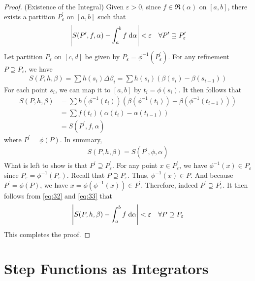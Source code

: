 \documentclass[thmcnt=section, 12pt]{my-elegantbook}
\begin{document}
\begin{proof}
    \par (Existence of the Integral) Given $\varepsilon > 0$, since $f \in \mathfrak{R}(\alpha)$ on $[a, b]$, there exists a partition $P^\prime_\varepsilon$ on $[a, b]$ such that 
    \begin{align}
        \left\lvert S(P^\prime, f, \alpha) - \int_a^b f \; \mathrm{d}\alpha \right\rvert < \varepsilon
        \quad \forall P^\prime \supseteq P^\prime_\varepsilon
        \label{eq:32}
    \end{align}
    Let partition $P_\varepsilon$ on $[c, d]$ be given by $P_\varepsilon = \phi^{-1}(P^\prime_\varepsilon)$. For any refinement $P \supseteq P_\varepsilon$, we have 
    \begin{align*}
        S(P, h, \beta)
        = \sum h(s_i) \Delta\beta_i
        = \sum h(s_i) (\beta(s_i) - \beta(s_{i-1}))
    \end{align*}
    For each point $s_i$, we can map it to $[a, b]$ by $t_i = \phi(s_i)$. It then follows that 
    \begin{align*}
        S(P, h, \beta)
        &= \sum h(\phi^{-1}(t_i)) (\beta(\phi^{-1}(t_i)) - \beta(\phi^{-1}(t_{i-1}))) \\ 
        &= \sum f(t_i) (\alpha(t_i) - \alpha(t_{i-1})) \\ 
        &= S(P^\prime, f, \alpha)
    \end{align*}
    where $P^\prime = \phi(P)$. In summary,
    \begin{align}
        S(P, h, \beta) = S(P^\prime, \phi, \alpha)
        \label{eq:33}
    \end{align}
    What is left to show is that $P^\prime \supseteq P^\prime_\varepsilon$. For any point $x \in P^\prime_\varepsilon$, we have $\phi^{-1}(x) \in P_\varepsilon$ since $P_\varepsilon = \phi^{-1}(P_\varepsilon)$. Recall that $P \supseteq P_\varepsilon$. Thus, $\phi^{-1}(x) \in P$. And because $P^\prime = \phi(P)$, we have $x = \phi(\phi^{-1}(x)) \in P^\prime$. Therefore, indeed $P^\prime \supseteq P^\prime_\varepsilon$. It then follows from \eqref{eq:32} and \eqref{eq:33} that 
    \begin{align*}
        \left\lvert S(P, h, \beta) - \int_a^b f \; \mathrm{d}\alpha \right\rvert < \varepsilon
        \quad \forall P \supseteq P_\varepsilon
    \end{align*}
    This completes the proof.
\end{proof}


\section{Step Functions as Integrators}
\end{document}
